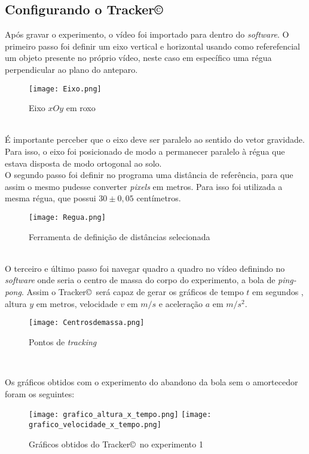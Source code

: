\documentclass[a4paper, 12pt]{article}
\begin{document}
		\subsection{Configurando o Tracker\copyright}
		Após gravar o experimento, o vídeo foi importado para dentro do \textsl{software}. O primeiro passo foi definir um eixo vertical e horizontal usando como referefencial um objeto presente no próprio vídeo, neste caso em específico uma régua perpendicular ao plano do anteparo.
		\begin{figure}[htb]
			\centering
			\texttt{[image: Eixo.png]}
			\caption{Eixo $xOy$ em roxo}
			\label{g1}
		\end{figure} \\
		É importante perceber que o eixo deve ser paralelo ao sentido do vetor gravidade. Para isso, o eixo foi posicionado de modo a permanecer paralelo à régua que estava disposta de modo ortogonal ao solo.\\
		\newpage
		\noindent O segundo passo foi definir no programa uma distância de referência, para que assim o mesmo pudesse converter \textsl{pixels} em metros. Para isso foi utilizada a mesma régua, que possui $30 \pm 0,05 $ centímetros.
		\begin{figure}[htb]
			\centering
			\texttt{[image: Regua.png]}
			\caption{Ferramenta de definição de distâncias selecionada}
			\label{g1}
		\end{figure} \\
		O terceiro e último passo foi navegar quadro a quadro no vídeo definindo no \textsl{software} onde seria o centro de massa do corpo do experimento, a bola de \textsl{ping-pong}. Assim o Tracker\copyright \, será capaz de gerar os gráficos de tempo $t$ em segundos , altura $y$ em metros, velocidade $v$ em $m/s$ e aceleração $a$ em $m/s^2$.
		\begin{figure}[htb]
			\centering
			\texttt{[image: Centrosdemassa.png]}
			\caption{Pontos de \textsl{tracking}}
			\label{g1}
		\end{figure} \\
		\newpage
		
		\noindent Os gráficos obtidos com o experimento do abandono da bola sem o amortecedor foram os seguintes:
		\begin{figure}[htb]
			\centering
			\texttt{[image: grafico\_altura\_x\_tempo.png]}
			\texttt{[image: grafico\_velocidade\_x\_tempo.png]}
			\caption{Gráficos obtidos do Tracker\copyright \, no experimento 1}
			\label{g1}
		\end{figure} \\
		
\end{document}
